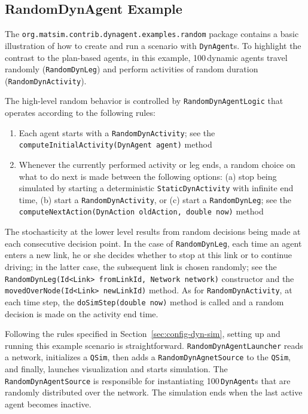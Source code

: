 \subsection{RandomDynAgent Example}
The \lstinline$org.matsim.contrib.dynagent.examples.random$ package contains a basic illustration of how to create and run a scenario with \lstinline$DynAgent$s. To highlight the contrast to the plan-based agents, in this example, 100\,dynamic agents travel randomly (\lstinline$RandomDynLeg$) and perform activities of random duration (\lstinline$RandomDynActivity$).

The high-level random behavior is controlled by \lstinline$RandomDynAgentLogic$ that operates according to the following rules:
%
\begin{enumerate}

	\item Each agent starts with a \lstinline$RandomDynActivity$; see the \lstinline$computeInitialActivity(DynAgent agent)$ method
	
	\item Whenever the currently performed activity or leg ends, a random choice on what to do next is made between the following options: (a) stop being simulated by starting a deterministic \lstinline$StaticDynActivity$ with infinite end time, (b) start a \lstinline$RandomDynActivity$, or (c) start a \lstinline$RandomDynLeg$; see the \lstinline$computeNextAction(DynAction oldAction, double now)$ method

\end{enumerate}

The stochasticity at the lower level results from random decisions being made at each consecutive decision point. In the case of \lstinline$RandomDynLeg$, each time an agent enters a new link, he or she decides whether to stop at this link or to continue driving; in the latter case, the subsequent link is chosen randomly; see the \lstinline$RandomDynLeg(Id<Link> fromLinkId, Network network)$ constructor and the \lstinline$movedOverNode(Id<Link> newLinkId)$ method. As for \lstinline$RandomDynActivity$, at each time step, the \lstinline$doSimStep(double now)$ method is called and a random decision is made on the activity end time.

Following the rules specified in Section~\ref{sec:config-dyn-sim}, setting up and running this example scenario is straightforward. \lstinline$RandomDynAgentLauncher$ reads a network, initializes a \lstinline$QSim$, then adds a \lstinline$RandomDynAgnetSource$ to the \lstinline$QSim$, and finally, launches visualization and starts simulation. The \lstinline$RandomDynAgentSource$ is responsible for instantiating 100\,\lstinline$DynAgent$s that are randomly distributed over the network. The simulation ends when the last active agent becomes inactive.

